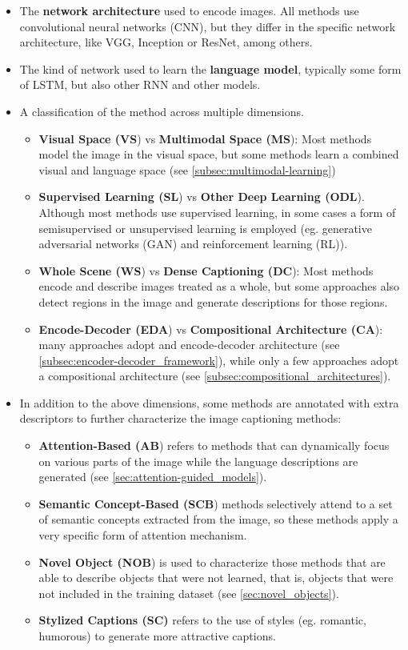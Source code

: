\begin{itemize}
\item The \textbf{network architecture} used to encode images. All methods use convolutional neural networks (CNN), but they differ in the specific network architecture, like VGG, Inception or ResNet, among others.
\item The kind of network used to learn the \textbf{language model}, typically some form of LSTM, but also other RNN and other models.
\item A classification of the method across multiple dimensions.
    \begin{itemize}
    \item \textbf{Visual Space (VS}) vs \textbf{Multimodal Space (MS}): Most methods model the image in the visual space, but some methods learn a combined visual and language space (see \cref{subsec:multimodal-learning})
    \item \textbf{Supervised Learning (SL}) vs \textbf{Other Deep Learning (ODL}). Although most methods use supervised learning, in some cases a form of semisupervised or unsupervised learning is employed (eg. generative adversarial networks (GAN) and reinforcement learning (RL)).
    \item \textbf{Whole Scene (WS}) vs \textbf{Dense Captioning (DC}): Most methods encode and describe images treated as a whole, but some approaches also detect regions in the image and generate descriptions for those regions.
    \item \textbf{Encode-Decoder (EDA}) vs \textbf{Compositional Architecture (CA}): many approaches adopt and encode-decoder architecture (see \cref{subsec:encoder-decoder_framework}), while only a few approaches adopt a compositional architecture (see \cref{subsec:compositional_architectures}).
    \end{itemize}
\item In addition to the above dimensions, some methods are annotated with extra descriptors to further characterize the image captioning methods:
    \begin{itemize}
    \item \textbf{Attention-Based (AB}) refers to methods that can dynamically focus on various parts of the image while the language descriptions are generated (see \cref{sec:attention-guided_models}).
    \item \textbf{Semantic Concept-Based (SCB}) methods selectively attend to a set of semantic concepts extracted from the image, so these methods apply a very specific form of attention mechanism.
    \item \textbf{Novel Object (NOB}) is used to characterize those methods that are able to describe objects that were not learned, that is, objects that were not included in the training dataset (see \cref{sec:novel_objects}).
    \item \textbf{Stylized Captions (SC)} refers to the use of styles  (eg. romantic, humorous) to generate more attractive captions. 
    \end{itemize}
\end{itemize}

